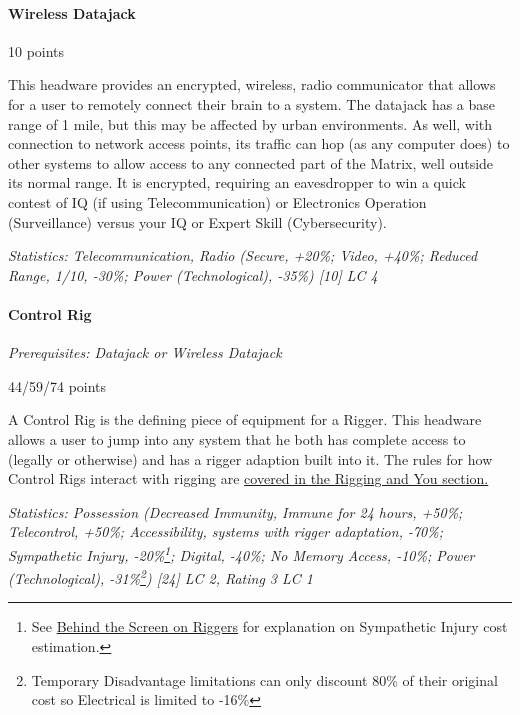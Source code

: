 \begin{multicols*}{3}
	\paragraph{Wireless Datajack}
	\begin{flushright}
		10 points
	\end{flushright}
	
	This headware provides an encrypted, wireless, radio communicator that allows for a user to remotely connect their brain to a system. The datajack has a base range of 1 mile, but this may be affected by urban environments. As well, with connection to network access points, its traffic can hop (as any computer does) to other systems to allow access to any connected part of the Matrix, well outside its normal range. It is encrypted, requiring an eavesdropper to win a quick contest of IQ (if using Telecommunication) or Electronics Operation (Surveillance) versus your IQ or Expert Skill (Cybersecurity).
	
	\textit{\textcolor{OliveGreen}{Statistics: Telecommunication, Radio (Secure, +20\%; Video, +40\%; Reduced Range, 1/10, -30\%; Power (Technological), -35\%) [10] LC 4}}
	
	\paragraph{Control Rig}\label{control_rig}
	\textit{Prerequisites: Datajack or Wireless Datajack}
	\begin{flushright}
		44/59/74 points
	\end{flushright}
	
	A Control Rig is the defining piece of equipment for a Rigger. This headware allows a user to jump into any system that he both has complete access to (legally or otherwise) and has a rigger adaption built into it. The rules for how Control Rigs interact with rigging are \hyperref[riggers]{covered in the Rigging and You section.}
	
	\textit{\textcolor{OliveGreen}{Statistics: Possession (Decreased Immunity, Immune for 24 hours, +50\%; Telecontrol, +50\%; Accessibility, systems with rigger adaptation, -70\%; Sympathetic Injury, -20\%\footnote{See \hyperref[bts_riggers]{Behind the Screen on Riggers} for explanation on Sympathetic Injury cost estimation.}; Digital, -40\%; No Memory Access, -10\%; Power (Technological), -31\%\footnote{Temporary Disadvantage limitations can only discount 80\% of their original cost  so Electrical is limited to -16\%}) [24] LC 2, Rating 3 LC 1}}
	

\end{multicols*}
